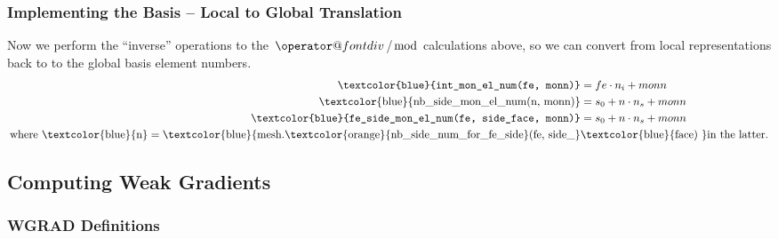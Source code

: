 \documentclass[compress]{beamer}
\makeatletter
\newcommand*{\bdiv}{%
  \nonscript\mskip-\medmuskip\mkern5mu%
  \mathbin{\operator@font div}\penalty900\mkern5mu%
  \nonscript\mskip-\medmuskip
}
\makeatother
\begin{document}
\begin{frame}
  \frametitle{Implementing the Basis -- Local to Global Translation}
  \pause
  Now we perform the ``inverse'' operations to the $\bdiv$/$\bmod$ calculations above, so we can convert from local representations back to
  to the global basis element numbers.
  \pause
  \begin{align*}
    \text{\texttt{\textcolor{blue}{int\_mon\_el\_num({fe, monn})}}} &= fe \cdot n_i + monn \\
    \text{\textcolor{blue}{nb\_side\_mon\_el\_num({n, monn})}} &= s_0 + n \cdot n_s + monn\\
    \text{\texttt{\textcolor{blue}{fe\_side\_mon\_el\_num({fe, side\_face, monn})}}} &= s_0 + n \cdot n_s + monn\\
      \text{where } \text{\textcolor{blue}{n}} = 
      \text{\textcolor{blue}{mesh.\textcolor{orange}{nb\_side\_num\_for\_fe\_side}(fe, side\_}}&\text{\textcolor{blue}{face) }}
        \text{in the latter}.
  \end{align*}
\end{frame}

\subsection{Computing Weak Gradients}

\subsubsection{WGRAD Definitions}
\end{document}
